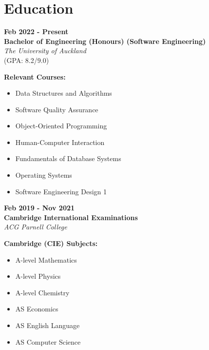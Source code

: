 \documentclass[a4paper,12pt]{article}
\newcommand{\sectionicon}[2]{%
    \section[#1]{\faIcon{#2}\quad #1}%
}
\begin{document}

\sectionicon{Education}{graduation-cap}

\begin{minipage}[t]{0.45\textwidth}
\textbf{Feb 2022 - Present} \\
\textbf{Bachelor of Engineering (Honours) (Software Engineering)} \\
\textit{The University of Auckland} \\
(GPA: 8.2/9.0)
\end{minipage}
\hfill
\begin{minipage}[t]{0.45\textwidth}
\textbf{Relevant Courses:}
\begin{itemize}
    \item Data Structures and Algorithms
    \item Software Quality Assurance
    \item Object-Oriented Programming
    \item Human-Computer Interaction
    \item Fundamentals of Database Systems
    \item Operating Systems
    \item Software Engineering Design 1
\end{itemize}
\end{minipage}

\vspace{0.5cm} %

\begin{minipage}[t]{0.45\textwidth}
\textbf{Feb 2019 - Nov 2021} \\
\textbf{Cambridge International Examinations} \\
\textit{ACG Parnell College} \\
\end{minipage}
\hfill
\begin{minipage}[t]{0.45\textwidth}
\textbf{Cambridge (CIE) Subjects:}
\begin{itemize}
    \item A-level Mathematics
    \item A-level Physics
    \item A-level Chemistry
    \item AS Economics
    \item AS English Language
    \item AS Computer Science
\end{itemize}
\end{minipage}
\end{document}
